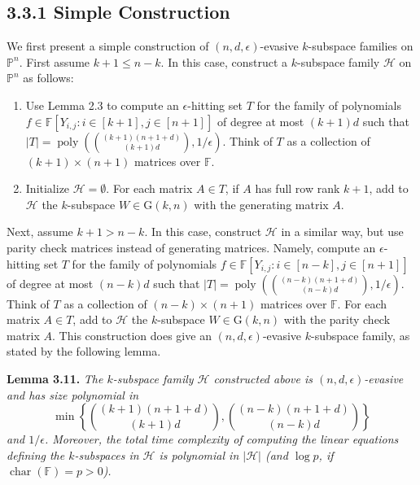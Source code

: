 \documentclass[10pt,a4paper]{article}
\newcommand{\FF}{\mathbb F}
\newcommand{\PP}{\mathbb P}
\newcommand{\GG}{\mathrm G}
\newenvironment{result}[1]{\par\medskip\noindent\textbf{#1.}\itshape}{\par\medskip}
\begin{document}
\subsection*{3.3.1 Simple Construction}
We first present a simple construction of $(n,d,\epsilon)$-evasive $k$-subspace families on $\PP^n$.
First assume $k+1\le n-k$. In this case, construct a $k$-subspace family $\mathcal H$ on $\PP^n$ as follows:
\begin{enumerate}
\item Use Lemma 2.3 to compute an $\epsilon$-hitting set $T$ for the family of polynomials $f\in\FF[Y_{i,j}:i\in[k+1],j\in[n+1]]$ of degree at most $(k+1)d$ such that $|T|=\operatorname{poly}(\binom{(k+1)(n+1+d)}{(k+1)d},1/\epsilon)$. Think of $T$ as a collection of $(k+1)\times(n+1)$ matrices over $\FF$.
\item Initialize $\mathcal H=\emptyset$. For each matrix $A\in T$, if $A$ has full row rank $k+1$, add to $\mathcal H$ the $k$-subspace $W\in\GG(k,n)$ with the generating matrix $A$.
\end{enumerate}
Next, assume $k+1>n-k$. In this case, construct $\mathcal H$ in a similar way, but use parity check matrices instead of generating matrices. Namely, compute an $\epsilon$-hitting set $T$ for the family of polynomials $f\in\FF[Y_{i,j}:i\in[n-k],j\in[n+1]]$ of degree at most $(n-k)d$ such that $|T|=\operatorname{poly}(\binom{(n-k)(n+1+d)}{(n-k)d},1/\epsilon)$. Think of $T$ as a collection of $(n-k)\times(n+1)$ matrices over $\FF$. For each matrix $A\in T$, add to $\mathcal H$ the $k$-subspace $W\in\GG(k,n)$ with the parity check matrix $A$.
This construction does give an $(n,d,\epsilon)$-evasive $k$-subspace family, as stated by the following lemma.
\begin{result}{Lemma 3.11}
The $k$-subspace family $\mathcal H$ constructed above is $(n,d,\epsilon)$-evasive and has size polynomial in
\[\min\left\{\binom{(k+1)(n+1+d)}{(k+1)d},\binom{(n-k)(n+1+d)}{(n-k)d}\right\}\]
and $1/\epsilon$. Moreover, the total time complexity of computing the linear equations defining the $k$-subspaces in $\mathcal H$ is polynomial in $|\mathcal H|$ (and $\log p$, if $\operatorname{char}(\FF)=p>0$).
\end{result}
\end{document}
